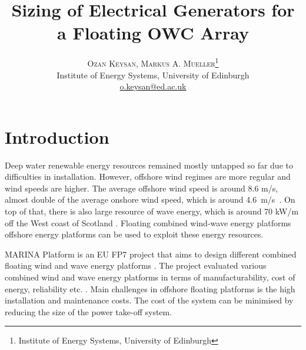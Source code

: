 \documentclass[twocolumn]{article}
\title{\vspace{-15mm}\fontsize{24pt}{10pt}\selectfont\textbf{Sizing of Electrical Generators for a Floating OWC Array}} %
\author{
\large
\textsc{Ozan Keysan, Markus A. Mueller}\thanks{Institute of Energy Systems, University of Edinburgh}\\[2mm] %
\normalsize Institute of Energy Systems, University of Edinburgh \\ %
\normalsize \href{mailto:o.keysan@ed.ac.uk}{o.keysan@ed.ac.uk} %
\vspace{-5mm}
}
\date{}
\begin{document}

\section{Introduction}

Deep water renewable energy resources remained mostly untapped so far due to difficulties in installation. However, offshore wind regimes are more regular and wind speeds are higher. The average offshore wind speed is around 8.6 m/s, almost double of the average onshore wind speed, which is around 4.6~m/s~\cite{Hau2013}. On top of that, there is also large resource of wave energy, which is around 70 kW/m off the West coast of Scotland \cite{BERR2008}. Floating combined wind-wave energy platforms offshore energy platforms can be used to exploit these energy resources.

MARINA Platform is an EU FP7 project that aims to design different combined floating wind and wave energy platforms \cite{marinaweb}. The project evaluated various combined wind and wave energy platforms in terms of manufacturability, cost of energy, reliability etc. \cite{Barrios2012}. Main challenges in offshore floating platforms is the high installation and maintenance costs. The cost of the system can be minimised by reducing the size of the power take-off system.
\end{document}

